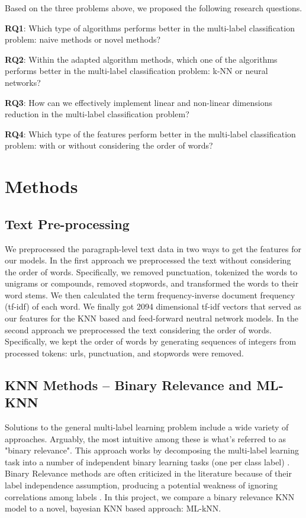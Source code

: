 \documentclass[11pt]{article}
\begin{document}
Based on the three problems above, we proposed the following research questions.

\textbf{RQ1}: Which type of algorithms performs better in the multi-label classification problem: naive methods or novel methods? 

\textbf{RQ2}: Within the adapted algorithm methods, which one of the algorithms performs better in the multi-label classification problem: k-NN or neural networks?

\textbf{RQ3}: How can we effectively implement linear and non-linear dimensions reduction in the multi-label classification problem?

\textbf{RQ4}: Which type of the features perform better in the multi-label classification problem: with or without considering the order of words? 

\section{Methods}

\subsection{Text Pre-processing}
We preprocessed the paragraph-level text data in two ways to get the features for our models. In the first approach we preprocessed the text without considering the order of words. Specifically, we removed punctuation, tokenized the words to unigrams or compounds, removed stopwords, and transformed the words to their word stems. We then calculated the term frequency-inverse document frequency (tf-idf) of each word. We finally got 2094 dimensional tf-idf vectors that served as our features for the KNN based and feed-forward neutral network models. In the second approach we preprocessed the text considering the order of words. Specifically, we kept the order of words by generating sequences of integers from processed tokens: urls, punctuation, and stopwords were removed. 

\subsection{KNN Methods -- Binary Relevance and ML-KNN}

Solutions to the general multi-label learning problem include a wide variety of approaches. Arguably, the most intuitive among these is what's referred to as "binary relevance". This approach works by decomposing the multi-label learning task into a number of independent binary learning tasks (one per class label) \autocite{brOverview}. Binary Relevance methods are often criticized in the literature because of their label independence assumption, producing a potential weakness of ignoring correlations among labels \autocite{brEfficacy}. In this project, we compare a binary relevance KNN model to a novel, bayesian KNN based approach: ML-kNN.
\end{document}
